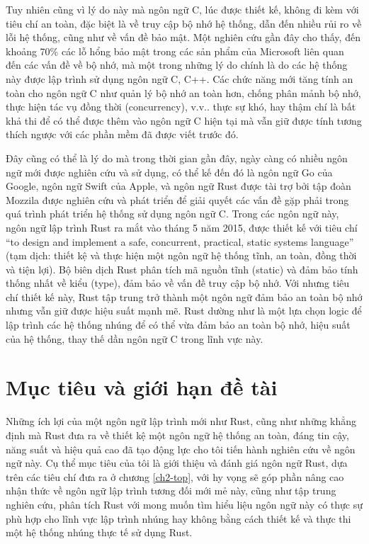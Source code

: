 Tuy nhiên cũng vì lý do này mà ngôn ngữ C, lúc được thiết kế, không đi kèm với tiêu chí an toàn, đặc biệt là về truy cập bộ nhớ hệ thống, dẫn đến nhiều rủi ro về lỗi hệ thống, cũng như về vấn đề bảo mật. Một nghiên cứu gần đây cho thấy, đến khoảng 70\% các lỗ hổng bảo mật trong các sản phẩm của Microsoft liên quan đến các vấn đề về bộ nhớ, mà một trong những lý do chính là do các hệ thống này được lập trình sử dụng ngôn ngữ C, C++.
Các chức năng mới tăng tính an toàn cho ngôn ngữ C như quản lý bộ nhớ an toàn hơn, chống phân mảnh bộ nhớ, thực hiện tác vụ đồng thời (concurrency), v.v.. thực sự khó, hay thậm chí là bất khả thi để có thể được thêm vào ngôn ngữ C hiện tại mà vẫn giữ được tính tương thích ngược với các phần mềm đã được viết trước đó.

Đây cũng có thể là lý do mà trong thời gian gần đây, ngày càng có nhiều ngôn ngữ mới được nghiên cứu và sử dụng, có thể kế đến đó là ngôn ngữ Go của Google, ngôn ngữ Swift của Apple, và ngôn ngữ Rust được tài trợ bởi tập đoàn Mozzila được nghiên cứu và phát triển để giải quyết các vấn đề gặp phải trong quá trình phát triển hệ thống sử dụng ngôn ngữ C. Trong các ngôn ngữ này, ngôn ngữ lập trình Rust ra mắt vào tháng 5 năm 2015, được thiết kế với tiêu chí ``to design and implement a safe, concurrent, practical, static systems language'' (tạm dịch: thiết kệ và thực hiện một ngôn ngữ hệ thống tĩnh, an toàn, đồng thời và tiện lợi). Bộ biên dịch Rust phân tích mã nguồn tĩnh (static) và đảm bảo tính thống nhất về kiểu (type), đảm bảo về vấn đề truy cập bộ nhớ. Với nhưng tiêu chí thiết kế này, Rust tập trung trở thành một ngôn ngữ đảm bảo an toàn bộ nhớ nhưng vẫn giữ được hiệu suất mạnh mẽ. Rust dường như là một lựa chọn logic để lập trình các hệ thống nhúng để có thể vừa đảm bảo an toàn bộ nhớ, hiệu suất của hệ thống, thay thế dần ngôn ngữ C trong lĩnh vực này.

\section{Mục tiêu và giới hạn đề tài}
Những ích lợi của một ngôn ngữ lập trình mới như Rust, cũng như những khẳng định mà Rust đưa ra về thiết kệ một ngôn ngữ hệ thống an toàn, đáng tin cậy, năng suất và hiệu quả cao đã tạo động lực cho tôi tiến hành nghiên cứu về ngôn ngữ này. Cụ thể mục tiêu của tôi là giới thiệu và đánh giá ngôn ngữ Rust, dựa trên các tiêu chí đưa ra ở chương \ref{ch2-top}, với hy vọng sẽ góp phần nâng cao nhận thức về ngôn ngữ lập trình tương đối mới mẻ này, cũng như tập trung nghiên cứu, phân tích Rust với mong muốn tìm hiểu liệu ngôn ngữ này có thực sự phù hợp cho lĩnh vực lập trình nhúng hay không bằng cách thiết kế và thực thi một hệ thống nhúng thực tế sử dụng Rust.

